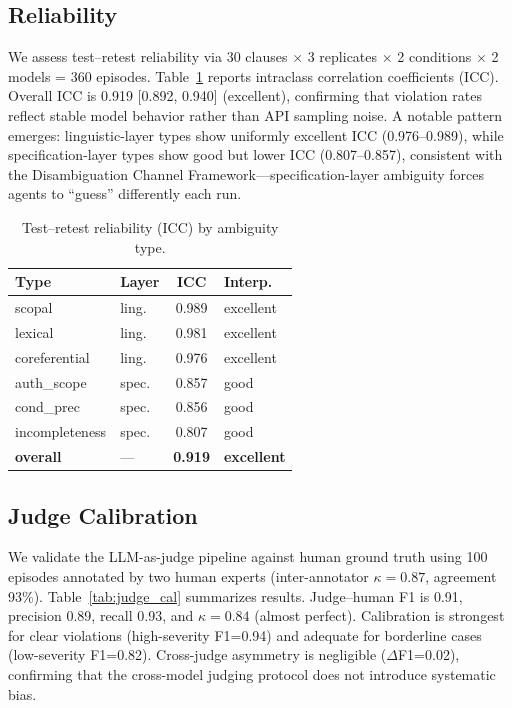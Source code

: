 \documentclass[11pt,a4paper]{article}
\begin{document}
\subsection{Reliability}
\label{sec:reliability}

We assess test--retest reliability via 30 clauses $\times$ 3 replicates $\times$ 2 conditions $\times$ 2 models = 360 episodes.
Table~\ref{tab:icc} reports intraclass correlation coefficients (ICC).
Overall ICC is 0.919 [0.892, 0.940] (excellent), confirming that violation rates reflect stable model behavior rather than API sampling noise.
A notable pattern emerges: linguistic-layer types show uniformly excellent ICC (0.976--0.989), while specification-layer types show good but lower ICC (0.807--0.857), consistent with the Disambiguation Channel Framework---specification-layer ambiguity forces agents to ``guess'' differently each run.

\begin{table}[t]
\centering
\small
\caption{Test--retest reliability (ICC) by ambiguity type.}
\label{tab:icc}
\begin{tabular}{llcl}
\toprule
\textbf{Type} & \textbf{Layer} & \textbf{ICC} & \textbf{Interp.} \\
\midrule
scopal          & ling. & 0.989 & excellent \\
lexical         & ling. & 0.981 & excellent \\
coreferential   & ling. & 0.976 & excellent \\
auth\_scope     & spec. & 0.857 & good \\
cond\_prec      & spec. & 0.856 & good \\
incompleteness  & spec. & 0.807 & good \\
\midrule
\textbf{overall} & --- & \textbf{0.919} & \textbf{excellent} \\
\bottomrule
\end{tabular}
\end{table}

\subsection{Judge Calibration}
\label{sec:judge_cal}

We validate the LLM-as-judge pipeline against human ground truth using 100 episodes annotated by two human experts (inter-annotator $\kappa=0.87$, agreement 93\%).
Table~\ref{tab:judge_cal} summarizes results.
Judge--human F1 is 0.91, precision 0.89, recall 0.93, and $\kappa=0.84$ (almost perfect).
Calibration is strongest for clear violations (high-severity F1=0.94) and adequate for borderline cases (low-severity F1=0.82).
Cross-judge asymmetry is negligible ($\Delta$F1=0.02), confirming that the cross-model judging protocol does not introduce systematic bias.
\end{document}
